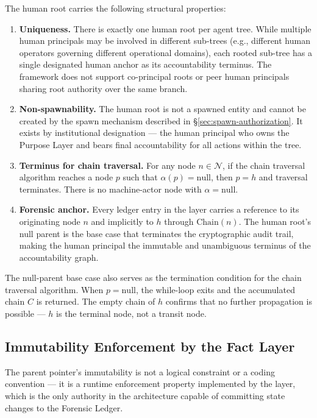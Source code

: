 The human root carries the following structural properties:

\begin{enumerate}
\item \textbf{Uniqueness.} There is exactly one human root per agent tree. While multiple human principals may be involved in different sub-trees (e.g., different human operators governing different operational domains), each rooted sub-tree has a single designated human anchor as its accountability terminus. The framework does not support co-principal roots or peer human principals sharing root authority over the same branch.

\item \textbf{Non-spawnability.} The human root is not a spawned entity and cannot be created by the spawn mechanism described in \S\ref{sec:spawn-authorization}. It exists by institutional designation — the human principal who owns the Purpose Layer and bears final accountability for all actions within the tree.

\item \textbf{Terminus for chain traversal.} For any node $n \in \mathcal{N}$, if the chain traversal algorithm reaches a node $p$ such that $\alpha(p) = \text{null}$, then $p = h$ and traversal terminates. There is no machine-actor node with $\alpha = \text{null}$.

\item \textbf{Forensic anchor.} Every ledger entry in the \fact{} layer carries a reference to its originating node $n$ and implicitly to $h$ through $\text{Chain}(n)$. The human root's null parent is the base case that terminates the cryptographic audit trail, making the human principal the immutable and unambiguous terminus of the accountability graph.
\end{enumerate}

The null-parent base case also serves as the termination condition for the chain traversal algorithm. When $p = \text{null}$, the while-loop exits and the accumulated chain $C$ is returned. The empty chain of $h$ confirms that no further propagation is possible — $h$ is the terminal node, not a transit node.

\subsection{Immutability Enforcement by the Fact Layer}

The parent pointer's immutability is not a logical constraint or a coding convention — it is a runtime enforcement property implemented by the \fact{} layer, which is the only authority in the \bxthree{} architecture capable of committing state changes to the Forensic Ledger.

